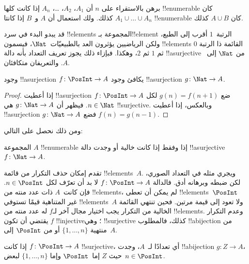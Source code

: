 \documentclass[../../../include/open-logic-section]{subfiles}
\begin{document}
\begin{prob}
برهن بالاستقراء على $n$ أن $A_1$، $A_2$، \dots، $A_n$ إذا كانت
كلها !!{enumerable} كان $A_1 \cup \dots \cup A_n$ كذلك.
ولك استعمال أن $A$ و~$B$ إذا كانتا !!{enumerable} كان $A \cup B$ كذلك.
\end{prob}

قد يبدو البدء في سرد !!{element}s المجموعة بـ!!{element} الرتبة~$1$
أقرب إلى الطبع، ولكن الرياضيين يؤثرون العد بالطبيعيّات~$\Nat$،
فيسمون !!{element}s القائمة ذا الرتبة $0$ ثم $1$ ثم $2$، وهكذا.
فبإزاء ذلك يجوز تعريف التعداد بأنه دالة !!a{surjective} من $\Nat$
إلى~$A$. والتعريفان متكافئان.

\begin{prop}
وجود !!a{surjection} $f\colon \PosInt \to A$ يكافئ وجود
!!a{surjection} $g\colon \Nat \to A$.
\end{prop}

\begin{proof}
إذا أعطيت !!a{surjection} $f\colon \PosInt \to A$ ضع $g(n) = f(n+1)$
لكل $n \in \Nat$. فيظهر أن $g\colon \Nat \to A$ هي !!{surjective}.
وبالعكس، إذا أعطيت !!a{surjection} $g\colon \Nat \to A$
فضع $f(n) = g(n-1)$.
\end{proof}

ومن ذلك نحصل على التالي:

\begin{cor}
المجموعة $A$ !!{enumerable} إذا وفقط إذا كانت خالية أو وجدت دالة
!!a{surjective} $f\colon \Nat \to A$.
\end{cor}

تقدم إمكان حذف التكرار من قائمة !!{element}s~$A$.
ويجري مثله في التعداد الصوري، لكن ضبطه وبرهانه أدق.
فالدالة $f\colon \PosInt \to A$ لا بد أن تعرّف لكل $n \in \PosInt$.
فإن كانت~$A$ ذات عدد منته من !!{element}s، لم يمكن أن تعطى
!!{element}s~$\PosInt$ غير المتناهية قيمًا تستوفي !!{element}s~$A$
ولا تعود إلى قيمة مرتين. فحين تنتهي القائمة الخالية من التكرار
يجب اختيار مجال آخر لـ$f$ له عدد منته من !!{element}s.
وعدم التكرار يقتضي أن تكون $f$ !!{injective}؛ وهي !!{surjective}
كذلك، فالمطلوب !!a{bijection} من منتهية $\{1, \dots, n\}$
أو من $\PosInt$ إلى~$A$.

\begin{prop}
إذا كانت $f\colon \PosInt \to A$ !!{surjective}، أي تعدادًا لـ~$A$،
وجدت !!a{bijection} $g\colon Z \to A$، حيث $Z$ إما~$\PosInt$
وإما $\{1, \dots, n\}$ لبعض~$n \in \PosInt$.
\end{prop}
\end{document}
